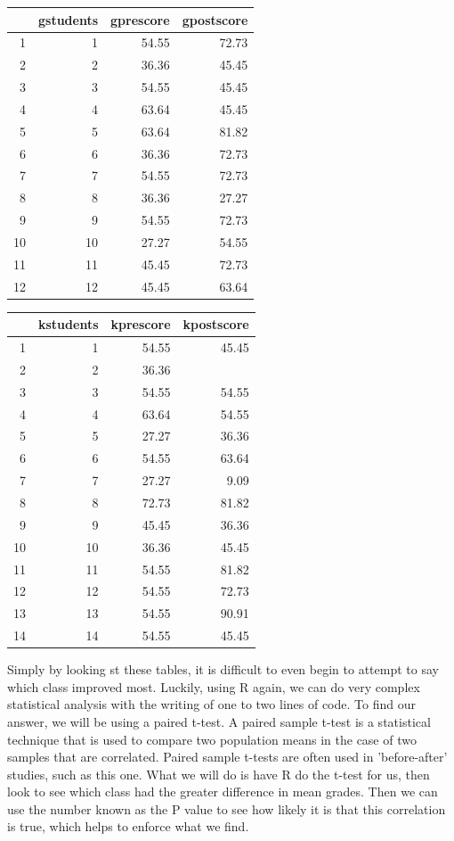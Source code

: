 \documentclass{article}\usepackage[]{graphicx}\usepackage[]{color}
\begin{document}
% 
\begin{tabular}{rrrr}
  \hline
 & gstudents & gprescore & gpostscore \\ 
  \hline
1 &   1 & 54.55 & 72.73 \\ 
  2 &   2 & 36.36 & 45.45 \\ 
  3 &   3 & 54.55 & 45.45 \\ 
  4 &   4 & 63.64 & 45.45 \\ 
  5 &   5 & 63.64 & 81.82 \\ 
  6 &   6 & 36.36 & 72.73 \\ 
  7 &   7 & 54.55 & 72.73 \\ 
  8 &   8 & 36.36 & 27.27 \\ 
  9 &   9 & 54.55 & 72.73 \\ 
  10 &  10 & 27.27 & 54.55 \\ 
  11 &  11 & 45.45 & 72.73 \\ 
  12 &  12 & 45.45 & 63.64 \\ 
   \hline
\end{tabular}
% 
\begin{tabular}{rrrr}
  \hline
 & kstudents & kprescore & kpostscore \\ 
  \hline
1 &   1 & 54.55 & 45.45 \\ 
  2 &   2 & 36.36 &  \\ 
  3 &   3 & 54.55 & 54.55 \\ 
  4 &   4 & 63.64 & 54.55 \\ 
  5 &   5 & 27.27 & 36.36 \\ 
  6 &   6 & 54.55 & 63.64 \\ 
  7 &   7 & 27.27 & 9.09 \\ 
  8 &   8 & 72.73 & 81.82 \\ 
  9 &   9 & 45.45 & 36.36 \\ 
  10 &  10 & 36.36 & 45.45 \\ 
  11 &  11 & 54.55 & 81.82 \\ 
  12 &  12 & 54.55 & 72.73 \\ 
  13 &  13 & 54.55 & 90.91 \\ 
  14 &  14 & 54.55 & 45.45 \\ 
   \hline
\end{tabular}


Simply by looking st these tables, it is difficult to even begin to attempt to say which class improved most. Luckily, using R again, we can do very complex statistical analysis with the writing of one to two lines of code. To find our answer, we will be using a paired t-test. A paired sample t-test is a statistical technique that is used to compare two population means in the case of two samples that are correlated. Paired sample t-tests are often used in 'before-after' studies, such as this one. What we will do is have R do the t-test for us, then look to see which class had the greater difference in mean grades. Then we can use the number known as the P value to see how likely it is that this correlation is true, which helps to enforce what we find.
\end{document}
